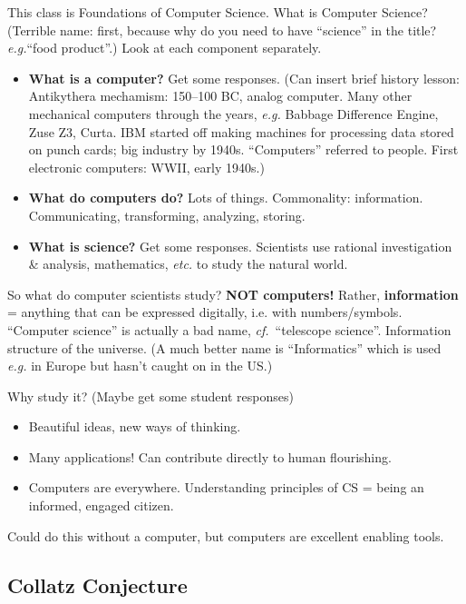 \documentclass{article}
\newcommand{\etc}{\emph{etc.}\xspace}
\newcommand{\eg}{\emph{e.g.}\xspace}
\begin{document}
This class is Foundations of Computer Science.  What is Computer
Science?  (Terrible name: first, because why do you need to have
``science'' in the title?  \eg ``food product''.)  Look at each
component separately.
\begin{itemize}
\item \textbf{What is a computer?}  Get some responses.  (Can insert
  brief history lesson: Antikythera mechamism: 150--100 BC, analog
  computer.  Many other mechanical computers through the years,
  \eg Babbage Difference Engine, Zuse Z3, Curta.  IBM started off
  making machines for processing data stored on punch cards; big
  industry by 1940s. ``Computers'' referred to people.  First
  electronic computers: WWII, early 1940s.)
\item \textbf{What do computers do?}  Lots of things.  Commonality:
  information.  Communicating, transforming, analyzing, storing.
\item \textbf{What is science?}  Get some responses.  Scientists use
  rational investigation \& analysis, mathematics, \etc to study the
  natural world.
\end{itemize}

So what do computer scientists study?  \textbf{NOT computers!}
Rather, \textbf{information} = anything that can be expressed
digitally, i.e. with numbers/symbols.  ``Computer science'' is
actually a bad name, \emph{cf.}\ ``telescope science''.  Information
structure of the universe. (A much better name is ``Informatics''
which is used \eg in Europe but hasn't caught on in the US.)

Why study it?  (Maybe get some student responses)
\begin{itemize}
\item Beautiful ideas, new ways of thinking.
\item Many applications!  Can contribute directly to human flourishing.
\item Computers are everywhere.  Understanding principles of CS =
  being an informed, engaged citizen.
\end{itemize}
Could do this without a computer, but computers are excellent enabling
tools.

\subsection*{Collatz Conjecture}
\end{document}
